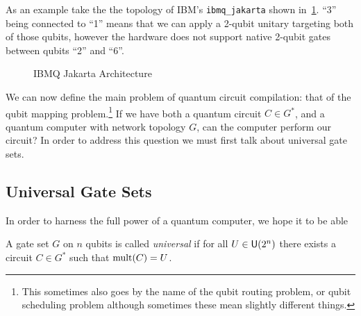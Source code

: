 As an example take the the topology of IBM's \texttt{ibmq\_jakarta} shown in~\ref{fig:ibm-jakarta}.
``3'' being connected to ``1'' means that we can apply a 2-qubit unitary targeting both of those qubits, however the hardware does not support native 2-qubit gates between qubits ``2'' and ``6''.
\begin{figure}[ht]
    \centering
    \caption{IBMQ Jakarta Architecture}\label{fig:ibm-jakarta}
\end{figure}

We can now define the main problem of quantum circuit compilation: that of the qubit mapping problem.\footnote{This sometimes also goes by the name of the qubit routing problem, or qubit scheduling problem although sometimes these mean slightly different things.}
If we have both a quantum circuit $C\in G^*$, and a quantum computer with network topology $G$, can the computer perform our circuit?
In order to address this question we must first talk about universal gate sets.

\subsection{Universal Gate Sets}
In order to harness the full power of a quantum computer, we hope it to be able
\begin{definition}
    A gate set $G$ on $n$ qubits is called \emph{universal} if for all $U\in\mathsf{U} (2^n)$ there exists a circuit $C\in G^*$ such that $\operatorname{mult}(C) = U$.
\end{definition}

